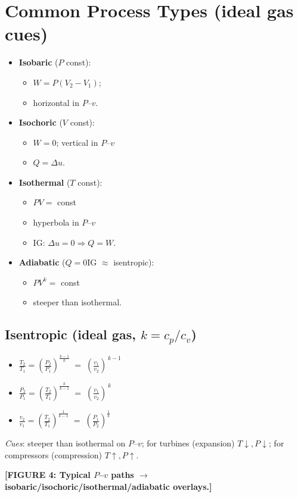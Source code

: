 \documentclass[10pt]{article}
\begin{document}
\section{Common Process Types (ideal gas cues)}
\begin{multicols}{2}

\begin{itemize}
    \item \textbf{Isobaric} ($P$ const):
    \begin{itemize}
        \item $W=P(V_2-V_1)$;
        \item horizontal in $P$--$v$.
    \end{itemize}
    \item \textbf{Isochoric} ($V$ const):
    \begin{itemize}
        \item $W=0$; vertical in $P$--$v$
        \item $Q=\Delta u$.
    \end{itemize}
    \item \textbf{Isothermal} ($T$ const):
    \begin{itemize}
        \item $PV=$ const
        \item hyperbola in $P$--$v$
        \item IG: $\Delta u=0\Rightarrow Q=W$.
    \end{itemize}
    \item \textbf{Adiabatic} ($Q=0$IG $\approx$ isentropic):
    \begin{itemize}
        \item $PV^k=$ const
        \item steeper than isothermal.
    \end{itemize}
\end{itemize}

\subsection{Isentropic (ideal gas, $k=c_p/c_v$)}
\begin{itemize}
    \item $ \displaystyle \frac{T_2}{T_1}=\left(\frac{P_2}{P_1}\right)^{\frac{k-1}{k}} \;=\; \left(\frac{v_1}{v_2}\right)^{\,k-1} $
    \item $ \displaystyle \frac{P_2}{P_1}=\left(\frac{T_2}{T_1}\right)^{\frac{k}{k-1}} \;=\; \left(\frac{v_1}{v_2}\right)^{\,k} $
    \item $ \displaystyle \frac{v_2}{v_1}=\left(\frac{T_2}{T_1}\right)^{\frac{1}{k-1}} \;=\; \left(\frac{P_1}{P_2}\right)^{\frac{1}{k}} $
\end{itemize}
\noindent
\emph{Cues}: steeper than isothermal on $P$--$v$; for turbines (expansion) $T\downarrow,P\downarrow$; for compressors (compression) $T\uparrow,P\uparrow$.

\textbf{[FIGURE 4: Typical $P$--$v$ paths $\to$ isobaric/isochoric/isothermal/adiabatic overlays.]}

\end{multicols}
\end{document}
